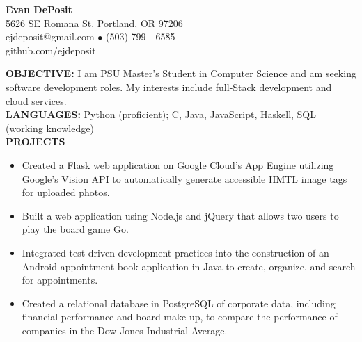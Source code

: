 \documentclass[11pt]{article}
\begin{document}
\thispagestyle{empty}
\begin{center}
\noindent \Large{\textbf{Evan DePosit}}\\
\large{5626 SE Romana St. Portland, OR 97206}\\
\large{ejdeposit@gmail.com $\bullet$ (503) 799 - 6585}\\
\large{github.com/ejdeposit}
\end{center}
\medskip
\noindent \large{\textbf{OBJECTIVE:}}
I am PSU Master's Student in Computer Science and am seeking software development roles. My interests include full-Stack development and cloud services.
\bigskip \\
\noindent \large{\textbf{LANGUAGES:}} Python (proficient); C, Java, JavaScript, Haskell, SQL (working knowledge) \bigskip\\
\noindent
\makebox[0pt][l]{\rule[-.2\baselineskip]{\linewidth}{.3mm}}%
\noindent
\makebox[0pt][l]{\rule[-.2\baselineskip]{\linewidth}{.3mm}} 
\large{\textbf{PROJECTS}}
\begin{itemize}[leftmargin=*, itemsep=0pt, topsep=5pt]
	\item Created a Flask web application on Google Cloud’s App Engine utilizing Google’s Vision API to automatically generate accessible HMTL image tags for uploaded photos.
	\item Built a web application using Node.js and jQuery that allows two users to play the board game Go.
	\item Integrated test-driven development practices into the construction of an Android appointment book application in Java to create, organize, and search for appointments.
	\item Created a relational database in PostgreSQL of corporate data, including financial performance and board make-up, to compare the performance of companies in the Dow Jones Industrial Average.
\end{itemize} \medskip
\end{document}
